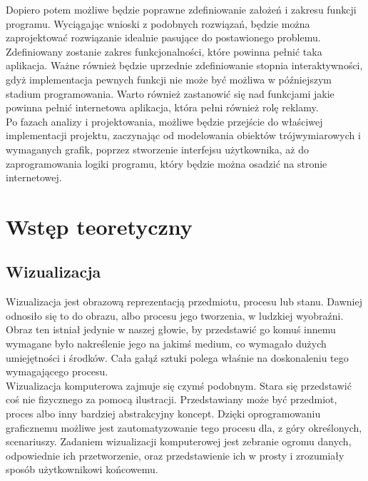 \documentclass{article} %
\begin{document}
Dopiero potem możliwe będzie poprawne zdefiniowanie założeń i zakresu funkcji programu. Wyciągając wnioski z podobnych rozwiązań, będzie można zaprojektować rozwiązanie idealnie pasujące do postawionego problemu. Zdefiniowany zostanie zakres funkcjonalności, które powinna pełnić taka aplikacja. Ważne również będzie uprzednie zdefiniowanie stopnia interaktywności, gdyż implementacja pewnych funkcji nie może być możliwa w późniejszym stadium programowania. Warto również zastanowić się nad funkcjami jakie powinna pełnić internetowa aplikacja, która pełni również rolę reklamy.
\\

Po fazach analizy i projektowania, możliwe będzie przejście do właściwej implementacji projektu, zaczynając od modelowania obiektów trójwymiarowych i wymaganych grafik, poprzez stworzenie interfejsu użytkownika, aż do  zaprogramowania logiki programu, który będzie można osadzić na stronie internetowej.
\\



\section{Wstęp teoretyczny}
   
    \subsection{Wizualizacja}
        Wizualizacja jest obrazową reprezentacją przedmiotu, procesu lub stanu. Dawniej odnosiło się to do obrazu, albo procesu jego tworzenia, w ludzkiej wyobraźni. Obraz ten istniał jedynie w naszej głowie, by przedstawić go komuś innemu wymagane było nakreślenie jego na jakimś medium, co wymagało dużych umiejętności i środków. Cała gałąź sztuki polega właśnie na doskonaleniu tego wymagającego procesu.
        \\
        
        Wizualizacja komputerowa zajmuje się czymś podobnym. Stara się przedstawić coś nie fizycznego za pomocą ilustracji. Przedstawiany może być przedmiot, proces albo inny bardziej abstrakcyjny koncept. Dzięki oprogramowaniu graficznemu możliwe jest zautomatyzowanie tego procesu dla, z góry określonych, scenariuszy. Zadaniem wizualizacji komputerowej jest zebranie ogromu danych, odpowiednie ich przetworzenie, oraz przedstawienie ich w prosty i zrozumiały sposób użytkownikowi końcowemu.
        \\
        
\end{document}
